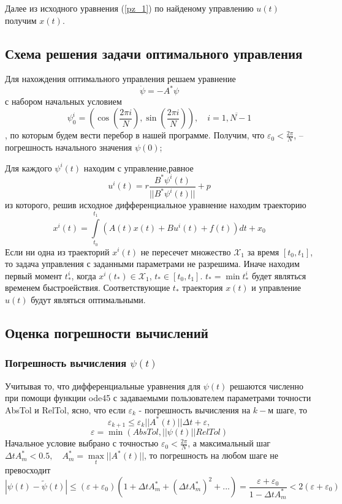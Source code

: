 \documentclass{article}
\begin{document}
    Далее из исходного уравнения (\ref{pz_1}) по найденому управлению $u(t)$ получим $x(t)$.

\subsection{Схема решения задачи оптимального управления}
    Для нахождения оптимального управления решаем уравнение $$\dot\psi = -A^*\psi$$ с набором начальных условием $$\psi_0^i = \left(\cos(\frac{2\pi i}{N}), \sin(\frac{2\pi i}{N})\right), \quad {i = \overline{1, {N-1}}}$$, по которым будем вести перебор в нашей программе. Получим, что $\varepsilon_0 <  \frac{2\pi}{N}$, -- погрешность начального значения $\psi(0)$;

    Для каждого $\psi^i(t)$ находим с управление,равное
    $$u^i(t) = r\frac{B^*\psi^i(t)}{||B^*\psi^i(t)||} + p$$
    из которого, решив исходное дифференциальное уравнение находим траекторию 
    $$x^i(t) = \int\limits_{t_0}^{t_1}\left(A(t)x(t)+Bu^i(t)+f(t)\right)dt+x_0$$
    Если ни одна из траекторий $x^i(t)$ не пересечет множество $\mathcal{X}_1$ за время $[t_0, t_1]$, то задача управления с заданными параметрами не разрешима. Иначе находим первый момент $t_*^i$, когда $x^i(t_*) \in \mathcal{X}_1$, $t_* \in [t_0, t_1]$. $t_* = \min{t_*^i}$ будет являться временем быстроействия. Соответствующие $t_*$ траектория $x(t)$ и управление $u(t)$ будут являться оптимальными.

\subsection{Оценка погрешности вычислений}
    \subsubsection{Погрешность вычисления $\psi(t)$}
        Учитывая то, что дифференциальные уравнения для $\psi(t)$ решаются численно при помощи функции ode45 с задаваемыми пользователем параметрами точности AbsTol и RelTol, ясно, что если $\varepsilon_k$ - погрешность вычисления на ${k-}$м шаге, то
        $$\varepsilon_{k+1} \le \varepsilon_k||A^*(t)||\Delta t + \varepsilon,$$
        $$\varepsilon = \min(AbsTol, ||\psi(t)||RelTol)$$
        Начальное условие выбрано с точностью $\varepsilon_0 < \frac{2\pi}{N}$, а максимальный шаг ${\Delta t{A^*_m} < 0.5},\quad{{A^*_m} = \max\limits_{t}^{}||A^*(t)||}$, то погрешность на любом шаге не превосходит
        $$|\psi(t)-\tilde\psi(t)|\leq{(\varepsilon + \varepsilon_0)(1 + \Delta tA^*_m + (\Delta tA^*_m)^2 + ...) = \frac{\varepsilon + \varepsilon_0}{1 - \Delta tA^*_m}} < 2{(\varepsilon + \varepsilon_0)}$$
\end{document}
